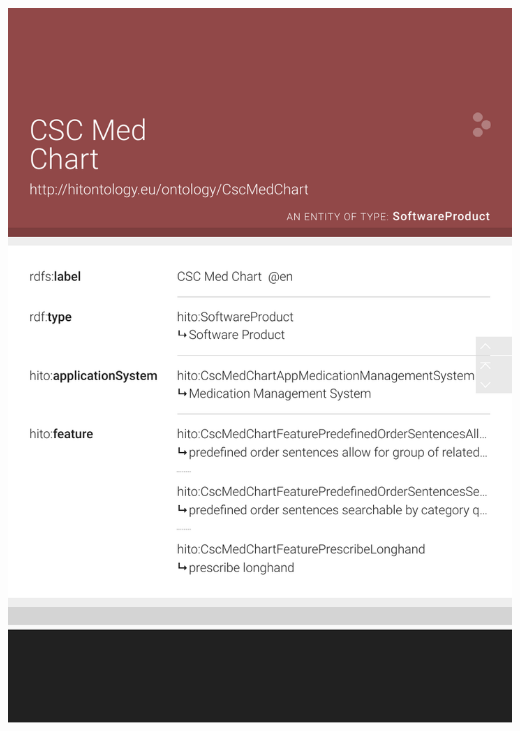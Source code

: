 \documentclass[aspectratio=1610]{beamer}%
\begin{document}
\begin{frame}[plain]
\begin{columns}
 \begin{column}{.55\textwidth}
  \centering\includegraphics[width=1.0\textwidth,height=1.0\textheight,keepaspectratio,trim=0 100 0 0,clip]{cscmedchart-lodview.pdf}
 \end{column}
 

\end{columns}
\end{frame}
\end{document}
